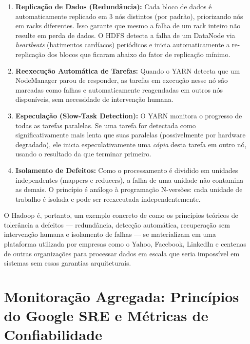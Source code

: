 \documentclass[12pt,a4paper,twoside]{report}
\begin{document}
\begin{enumerate}
    \item \textbf{Replicação de Dados (Redundância):} Cada bloco de dados é
    automaticamente replicado em 3 nós distintos (por padrão), priorizando nós
    em racks diferentes. Isso garante que mesmo a falha de um rack inteiro não
    resulte em perda de dados. O HDFS detecta a falha de um DataNode via
    \emph{heartbeats} (batimentos cardíacos) periódicos e inicia automaticamente
    a re-replicação dos blocos que ficaram abaixo do fator de replicação mínimo.

    \item \textbf{Reexecução Automática de Tarefas:} Quando o YARN detecta que
    um NodeManager parou de responder, as tarefas em execução nesse nó são
    marcadas como falhas e automaticamente reagendadas em outros nós disponíveis,
    sem necessidade de intervenção humana.

    \item \textbf{Especulação (Slow-Task Detection):} O YARN monitora o
    progresso de todas as tarefas paralelas. Se uma tarefa for detectada como
    significativamente mais lenta que suas paralelas (possivelmente por hardware
    degradado), ele inicia especulativamente uma \emph{cópia} desta tarefa em
    outro nó, usando o resultado da que terminar primeiro.

    \item \textbf{Isolamento de Defeitos:} Como o processamento é dividido em
    unidades independentes (mappers e reducers), a falha de uma unidade não
    contamina as demais. O princípio é análogo à programação N-versões: cada
    unidade de trabalho é isolada e pode ser reexecutada independentemente.
\end{enumerate}

O Hadoop é, portanto, um exemplo concreto de como os princípios teóricos de
tolerância a defeitos --- redundância, detecção automática, recuperação sem
intervenção humana e isolamento de falhas --- se materializam em uma plataforma
utilizada por empresas como o Yahoo, Facebook, LinkedIn e centenas de outras
organizações para processar dados em escala que seria impossível em sistemas
sem essas garantias arquiteturais.

\clearpage


\chapter{Monitoração Agregada: Princípios do Google SRE e Métricas de Confiabilidade}
\end{document}
